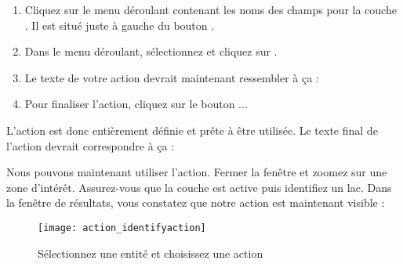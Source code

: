 \begin{enumerate}
\item Cliquez sur le menu d\'eroulant contenant les noms des champs pour la couche . Il est situ\'e juste \`a gauche du bouton .
\item Dans le menu d\'eroulant, s\'electionnez  et cliquez sur .
\item Le texte de votre action devrait maintenant ressembler \`a \c{c}a :\\
\item Pour finaliser l'action, cliquez sur le bouton ...
\end{enumerate}

L'action est donc enti\`erement d\'efinie et pr\^ete \`a \^etre utilis\'ee. Le texte final de l'action devrait correspondre \`a \c{c}a :

\begin{center}
\end{center}

Nous pouvons maintenant utiliser l'action. Fermer la fen\^etre  et zoomez sur une zone d'int\'er\^et. Assurez-vous que la couche  est active puis identifiez un lac. Dans la fen\^etre de r\'esultats, vous constatez que notre action est maintenant visible :

\begin{figure}[H]
  \begin{center}
  \caption{S\'electionnez une entit\'e et choisissez une action \nixcaption}\label{fig:identify_action}\smallskip
  \texttt{[image: action\_identifyaction]}
\end{center}
\end{figure}

